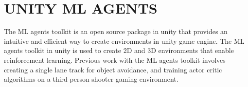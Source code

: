 \section{UNITY ML AGENTS} \label{lit-mlagents}

The ML agents toolkit is an open source package in unity that provides an intuitive and efficient way to create environments in unity game engine. The ML agents toolkit in unity is used to create 2D and 3D environments that enable reinforcement learning. Previous work with the ML agents toolkit involves creating a single lane track for object avoidance\cite{MLagents1}, and training actor critic algorithms on a third person shooter gaming environment\cite{MLagents2}. 





